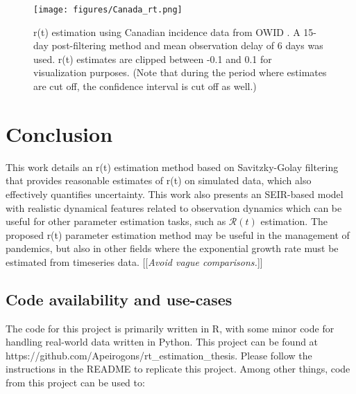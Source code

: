 \documentclass{article}
\newcommand{\nR}{\mathcal{R}}
\newcommand{\jd}[1]{[[\textsl{#1}]]}
\begin{document}
{\clearpage
\begin{figure}[h!]
\centering
\texttt{[image: figures/Canada\_rt.png]}
\caption{r(t) estimation using Canadian incidence data from OWID \cite{OWID}. A 15-day post-filtering method and mean observation delay of 6 days was used. r(t) estimates are clipped between -0.1 and 0.1 for visualization purposes. (Note that during the period where estimates are cut off, the confidence interval is cut off as well.)}
\end{figure}

\section{Conclusion}
This work details an r(t) estimation method based on Savitzky-Golay filtering that provides reasonable estimates of r(t) on simulated data, which also effectively quantifies uncertainty. This work also presents an SEIR-based model with realistic dynamical features related to observation dynamics which can be useful for other parameter estimation tasks, such as $\nR(t)$ estimation. The proposed r(t) parameter estimation method may be useful in the management of pandemics, but also in other fields where the exponential growth rate must be estimated from timeseries data. 
\jd{Avoid vague comparisons.}

\subsection{Code availability and use-cases}
The code for this project is primarily written in R, with some minor code for handling real-world data written in Python. This project can be found at https://github.com/Apeirogons/rt\_estimation\_thesis. Please follow the instructions in the README to replicate this project. Among other things, code from this project can be used to:

}
\end{document}

